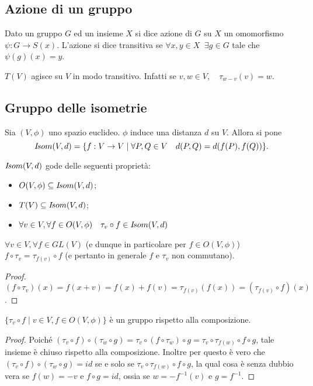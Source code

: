 	\subsection{Azione di un gruppo}
 
 Dato un gruppo $G$ ed un insieme $X$ si dice azione di $G$ su $X$ un omomorfismo
 $\psi:G\to S(x)$.
 L'azione si dice transitiva se  $\forall x,y\in X\;\;\exists g\in G$ tale che  $\psi(g)(x)=y$.
 
 \begin{remark}
 $T(V)$ agisce su $V$ in modo transitivo.
 Infatti se $v,w\in V,\quad\tau_{w-v}(v)=w$.
 \end{remark}
 
	\subsection{Gruppo delle isometrie}
 
 Sia $(V,\phi)$ uno spazio euclideo. $\phi$ induce una distanza $d$ su $V$. Allora si pone
 $$I\!som(V,d)=\{f:V\to V\;|\;\forall P,Q\in V\quad d(P,Q)=d(f(P),f(Q))\}.$$
 
 \begin{remark} $I\!som( V,d)$ gode delle seguenti proprietà:
 \begin{itemize}
	\item $O(V,\phi)\subseteq I\!som( V,d)$;
	\item $T(V)\subseteq I\!som( V,d)$;
	\item $\forall v\in V,\forall f\in O(V,\phi)\quad\tau_v\circ f\in I\!som( V,d)$
 \end{itemize}
 \end{remark}
 
 \begin{lemma}
 $\forall v\in V, \forall f\in GL(V)$ (e dunque in particolare per 
 $f\in O(V,\phi)$) $f\circ\tau_v=\tau_{f(v)}\circ f$ (e pertanto in generale $f$ e $\tau_v$ non commutano).
 \end{lemma}
 
 \begin{proof}
 $(f\circ\tau_v)(x)=f(x+v)=f(x)+f(v)=\tau_{f(v)}(f(x))=(\tau_{f(v)}\circ f)(x)$.
  \end{proof}
 
 \begin{proposition}
 $\{\tau_v\circ f\;|\;v\in V,f\in O(V,\phi)\}$ è un gruppo rispetto alla composizione.
 \end{proposition}
 
 \begin{proof}
 Poiché  $(\tau_v\circ f)\circ(\tau_w\circ g)=\tau_v\circ(f\circ\tau_w)\circ g=
 \tau_v\circ\tau_{f(w)}\circ f\circ g$, tale insieme è chiuso rispetto alla composizione.
 Inoltre per questo è vero che $(\tau_v\circ f)\circ(\tau_w\circ g)=id$ se e solo se $\tau_v\circ\tau_{f(w)}\circ f\circ g$,
 la qual cosa è senza dubbio vera se $f(w)=-v$  e  $f\circ g=id$, ossia se $w=-f^{-1}(v)$  e 
 $g=f^{-1}$.
  \end{proof}
 
